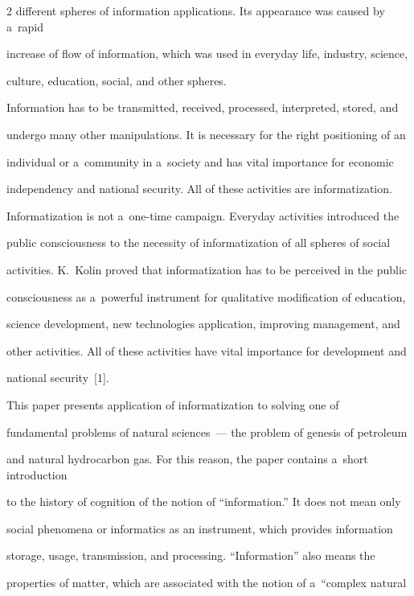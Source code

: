 \begin{multicols}{2}
different spheres of information applications. Its appearance was caused by a~rapid 

increase of flow of information, which was used in everyday life, industry, science, 

culture, education, social, and other spheres.

   

   Information has to be transmitted, received, processed, interpreted, stored, and 

undergo many other manipulations. It is necessary for the right positioning of an 

individual or a~community in a~society and has vital importance for economic 

independency and national security. All of these activities are informatization.

   

   Informatization is not a~one-time campaign. Everyday activities introduced the 

public consciousness to the necessity of informatization of all spheres of social 

activities. K.~Kolin proved that informatization has to be perceived in the public 

consciousness as a~powerful instrument for qualitative modification of education, 

science development, new technologies application, improving management, and 

other activities. All of these activities have vital importance for development and 

national security~[1].

   

   This paper presents application of informatization to solving one of 

fundamental problems of natural sciences~--- the problem of genesis of petroleum 

and natural hydrocarbon gas. For this reason, the paper contains a~short introduction 

to the history of cognition of the notion of ``information.'' It does not mean only 

social phenomena or informatics as an instrument, which provides information 

storage, usage, transmission, and processing. ``Information'' also means the 

properties of matter, which are associated with the notion of a~``complex natural 


\end{multicols}
